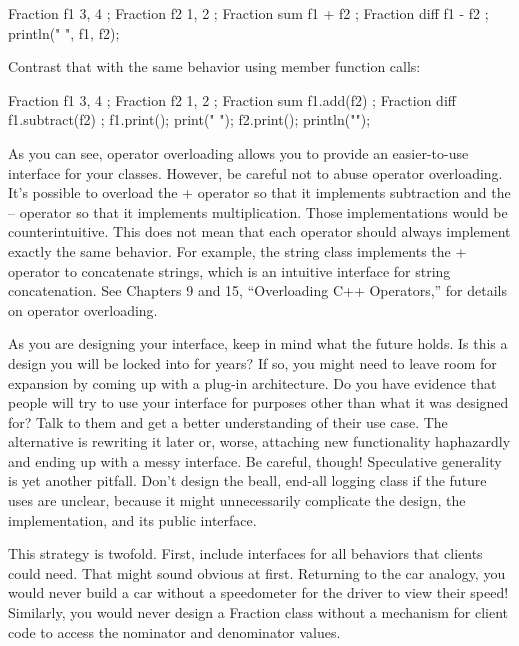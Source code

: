 \begin{cpp}
Fraction f1 { 3, 4 };
Fraction f2 { 1, 2 };
Fraction sum { f1 + f2 };
Fraction diff { f1 - f2 };
println("{} {}", f1, f2);
\end{cpp}

Contrast that with the same behavior using member function calls:

\begin{cpp}
Fraction f1 { 3, 4 };
Fraction f2 { 1, 2 };
Fraction sum { f1.add(f2) };
Fraction diff { f1.subtract(f2) };
f1.print();
print(" ");
f2.print();
println("");
\end{cpp}

As you can see, operator overloading allows you to provide an easier-to-use interface for your classes. However, be careful not to abuse operator overloading. It’s possible to overload the + operator so that it implements subtraction and the – operator so that it implements multiplication. Those implementations would be counterintuitive. This does not mean that each operator should always implement exactly the same behavior. For example, the string class implements the + operator to concatenate strings, which is an intuitive interface for string concatenation. See Chapters 9 and 15, “Overloading C++ Operators,” for details on operator overloading.


As you are designing your interface, keep in mind what the future holds. Is this a design you will be locked into for years? If so, you might need to leave room for expansion by coming up with a plug-in architecture. Do you have evidence that people will try to use your interface for purposes other than what it was designed for? Talk to them and get a better understanding of their use case. The alternative is rewriting it later or, worse, attaching new functionality haphazardly and ending up with a messy interface. Be careful, though! Speculative generality is yet another pitfall. Don’t design the beall, end-all logging class if the future uses are unclear, because it might unnecessarily complicate the design, the implementation, and its public interface.

This strategy is twofold. First, include interfaces for all behaviors that clients could need. That might sound obvious at first. Returning to the car analogy, you would never build a car without a speedometer for the driver to view their speed! Similarly, you would never design a Fraction class without a mechanism for client code to access the nominator and denominator values.

